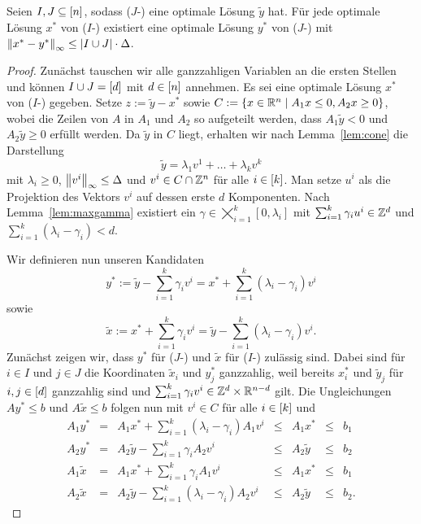 \begin{theorem}\label{thm:theo2}
	Seien $I,J\subseteq[n]$, sodass ($J$-\MIPR) eine optimale Lösung $\tilde{y}$ hat.
	Für jede optimale Lösung $x^*$ von ($I$-\MIPR) existiert eine optimale Lösung $y^*$ von ($J$-\MIPR) mit $\left\lVert x^*-y^*\right\rVert_\infty\leq\lvert I\cup J \rvert\cdot\Delta$.
\end{theorem}
\begin{proof}
	Zunächst tauschen wir alle ganzzahligen Variablen an die ersten Stellen und können $I\cup J=[d]$ mit $d\in[n]$ annehmen.
	Es sei eine optimale Lösung $x^*$ von ($I$-\MIPR) gegeben.
	Setze $z:=\tilde{y}-x^*$ sowie $C:=\{ x\in\mathbb{R}^n \mid A_1 x \leq 0, A_2x\geq0 \}$, wobei die Zeilen von $A$ in $A_1$ und $A_2$ so aufgeteilt werden, dass $A_1\tilde{y}<0$ und $A_2\tilde{y}\geq0$ erfüllt werden.
	Da $\tilde{y}$ in $C$ liegt, erhalten wir nach Lemma~\ref{lem:cone} die Darstellung 
	$$\tilde{y} = \lambda_1v^1 + \dots+\lambda_kv^k$$
	mit $\lambda_i\geq0$, $\left\lVert v^i\right\rVert_\infty\leq \Delta$ und $v^i\in C\cap\mathbb{Z}^n$ für alle $i\in[k]$.
	Man setze $u^i$ als die Projektion des Vektors $v^i$ auf dessen erste $d$ Komponenten.
	Nach Lemma~\ref{lem:maxgamma} existiert ein $\gamma\in\bigtimes_{i=1}^k[0,\lambda_i]$ mit  $\sum_{i=1}^k\gamma_iu^i\in\mathbb{Z}^d$ und $\sum_{i=1}^k(\lambda_i -\gamma_i)<d$.
	
	Wir definieren nun unseren Kandidaten $$y^*:=\tilde{y}-\sum_{i=1}^k\gamma_iv^i=x^*+\sum_{i=1}^k(\lambda_i-\gamma_i)v^i$$
	sowie $$\tilde{x}:=x^*+\sum_{i=1}^k\gamma_iv^i=\tilde{y}-\sum_{i=1}^k(\lambda_i-\gamma_i)v^i.$$
	Zunächst zeigen wir, dass $y^*$ für ($J$-\MIPR) und $\tilde{x}$ für ($I$-\MIPR) zulässig sind.
	Dabei sind für $i\in I$ und $j\in J$ die Koordinaten $\tilde{x}_i$ und $y^*_j$ ganzzahlig, weil bereits $x^*_i$ und $\tilde{y}_j$ für $i,j\in[d]$ ganzzahlig sind und $\sum_{i=1}^k\gamma_iv^i\in\mathbb{Z}^d\times\mathbb{R}^{n-d}$ gilt.
	Die Ungleichungen $Ay^*\leq b$ und $A\tilde{x}\leq b$ folgen nun mit $v^i\in C$ für alle $i\in[k]$ und 
	$$
	\begin{array}{lllllll}
	A_1 y^*&=&A_1x^*+\sum_{i=1}^k(\lambda_i-\gamma_i)A_1v^i &\leq& A_1 x^* &\leq&b_1\\
	A_2 y^*&=&A_2\tilde{y}-\sum_{i=1}^k\gamma_iA_2v^i &\leq& A_2\tilde{y} &\leq& b_2\\
	A_1\tilde{x} &=&A_1x^*+\sum_{i=1}^k \gamma_iA_1v^i &\leq& A_1x^* &\leq&b_1\\
	A_2\tilde{x} &=&A_2\tilde{y}-\sum_{i=1}^k(\lambda_i-\gamma_i)A_2v^i&\leq& A_2\tilde{y}&\leq& b_2.
	\end{array}
	$$
	

\end{proof}
